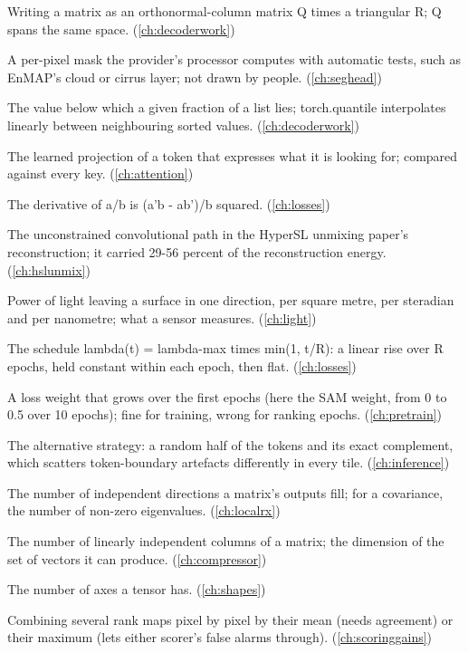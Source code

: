 \begin{description}[style=nextline,leftmargin=1.2em,font=\normalfont\bfseries]
\item[QR decomposition] Writing a matrix as an orthonormal-column matrix Q times a triangular R; Q spans the same space. (\cref{ch:decoderwork})
\item[Quality layer] A per-pixel mask the provider's processor computes with automatic tests, such as EnMAP's cloud or cirrus layer; not drawn by people. (\cref{ch:seghead})
\item[Quantile] The value below which a given fraction of a list lies; torch.quantile interpolates linearly between neighbouring sorted values. (\cref{ch:decoderwork})
\item[Query] The learned projection of a token that expresses what it is looking for; compared against every key. (\cref{ch:attention})
\item[Quotient rule] The derivative of a/b is (a'b - ab')/b squared. (\cref{ch:losses})
\item[R-theta branch] The unconstrained convolutional path in the HyperSL unmixing paper's reconstruction; it carried 29-56 percent of the reconstruction energy. (\cref{ch:hslunmix})
\item[Radiance] Power of light leaving a surface in one direction, per square metre, per steradian and per nanometre; what a sensor measures. (\cref{ch:light})
\item[Ramp] The schedule lambda(t) = lambda-max times min(1, t/R): a linear rise over R epochs, held constant within each epoch, then flat. (\cref{ch:losses})
\item[Ramped weight] A loss weight that grows over the first epochs (here the SAM weight, from 0 to 0.5 over 10 epochs); fine for training, wrong for ranking epochs. (\cref{ch:pretrain})
\item[Random inference mask] The alternative strategy: a random half of the tokens and its exact complement, which scatters token-boundary artefacts differently in every tile. (\cref{ch:inference})
\item[Rank] The number of independent directions a matrix's outputs fill; for a covariance, the number of non-zero eigenvalues. (\cref{ch:localrx})
\item[Rank (of a matrix)] The number of linearly independent columns of a matrix; the dimension of the set of vectors it can produce. (\cref{ch:compressor})
\item[Rank (of a tensor)] The number of axes a tensor has. (\cref{ch:shapes})
\item[Rank fusion] Combining several rank maps pixel by pixel by their mean (needs agreement) or their maximum (lets either scorer's false alarms through). (\cref{ch:scoringgains})

\end{description}
